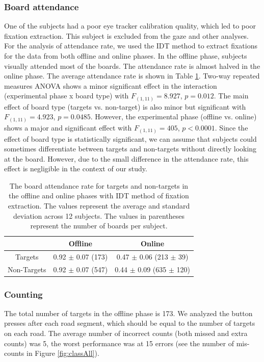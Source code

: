 \documentclass[12pt]{iopart}
\begin{document}
\subsubsection*{Board attendance}
One of the subjects
had a poor eye tracker calibration quality, which led
to poor fixation extraction.
This subject is excluded from the gaze and other analyses.
For the analysis of attendance rate, we used the IDT method to extract fixations 
for the data from both offline and online phases.
In the offline phase, subjects visually attended most of the boards. The attendance rate is almost halved in the online phase. 
The average attendance rate
is shown in Table \ref{tab:boardAtt}. 
Two-way repeated measures ANOVA shows a minor significant effect 
in the interaction (experimental phase x board type) with $F_{(1,11)} = 8.927$, $p = 0.012$. 
The main effect of board type (targets vs. non-target) is also minor but significant with $F_{(1,11)} = 4.923$, $p =0.0485$. 
However, the experimental phase (offline vs. online)
shows a major and significant effect with $F_{(1,11)} = 405$, $p < 0.0001$.
Since the effect of board type is statistically significant,
we can assume that subjects could sometimes differentiate between targets
and non-targets without directly looking at the board.
However, due to the small difference in the attendance rate,
this effect is negligible in the context of our study.


\begin{table}
    \centering
    \caption{The board attendance rate for targets and non-targets in the offline and online phases with IDT method of fixation
        extraction.
    The values represent the average and standard deviation across 12 subjects.
The values in parentheses represent the number of boards per subject.}
    \begin{tabular}{c | c | c}
        \hline 
        & Offline & Online \\
        \hline 
        Targets & 0.92 $\pm$ 0.07 (173) & 0.47 $\pm$ 0.06 (213 $\pm$ 39)\\
        Non-Targets & 0.92 $\pm$ 0.07 (547) & 0.44 $\pm$ 0.09  (635 $\pm$ 120)\\
        \hline 
    \end{tabular}
    \label{tab:boardAtt}
\end{table}




\subsubsection*{Counting}
The total number of targets in the offline phase is 173.
We analyzed the button presses after each road segment,
which should be equal to the number of targets
on each road.
The average number of incorrect counts (both missed and extra counts) was 5,
the worst performance was at 15 errors (see the number of mis-counts in Figure \ref{fig:classAll}).
\end{document}
